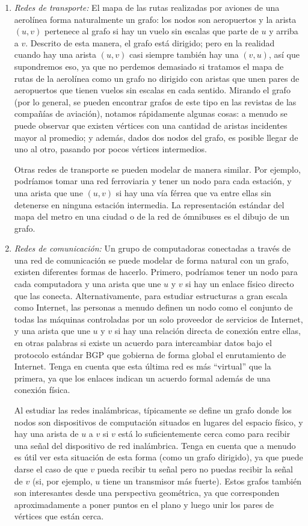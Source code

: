 \documentclass[a4paper, 12pt]{book}
\theoremstyle{dotless}
\begin{document}
\begin{enumerate}
\item \textit{Redes de transporte:} El mapa de las rutas realizadas por aviones de una aerolínea forma naturalmente un grafo: los nodos son aeropuertos y la arista $(u,v)$ pertenece al grafo si hay un vuelo sin escalas que parte de $u$ y arriba a $v$. Descrito de esta manera, el grafo está dirigido; pero en la realidad cuando hay una arista $(u,v)$ casi siempre también hay una $(v,u)$, así que supondremos eso, ya que no perdemos demasiado si tratamos el mapa de rutas de la aerolínea como un grafo no dirigido con aristas que unen pares de aeropuertos que tienen vuelos sin escalas en cada sentido. Mirando el grafo (por lo general, se pueden encontrar grafos de este tipo en las revistas de las compañías de aviación), notamos rápidamente algunas cosas: a menudo se puede observar que existen vértices con una cantidad de aristas incidentes mayor al promedio; y además, dados dos nodos del grafo, es posible llegar de uno al otro, pasando por pocos vértices intermedios. 

Otras redes de transporte se pueden modelar de manera similar. 
Por ejemplo, podríamos tomar una red ferroviaria y tener un nodo para cada estación, y una arista que une $(u,v)$ si hay una vía férrea que va entre ellas sin detenerse en ninguna estación intermedia. 
La representación estándar del mapa del metro en una ciudad o de la red de ómnibuses es el dibujo de un grafo.

\item \textit{Redes de comunicación:} 
Un grupo de computadoras conectadas a través de una red de comunicación se puede modelar de forma natural con un grafo, existen diferentes formas de hacerlo. 
Primero, podríamos tener un nodo para cada computadora y una arista que une $u$ y $v$ si hay un enlace físico directo que las conecta. 
Alternativamente, para estudiar estructuras a gran escala como Internet, las personas a menudo definen un nodo como el conjunto de todas las máquinas controladas por un solo proveedor de servicios de Internet, y una arista que une $u$ y $v$ si hay una relación directa de conexión entre ellas, en otras palabras si existe un acuerdo para intercambiar datos bajo el protocolo estándar BGP que gobierna de forma global el enrutamiento de Internet. 
Tenga en cuenta que esta última red es más ``virtual'' que la primera, ya que los enlaces indican un acuerdo formal además de una conexión física.

Al estudiar las redes inalámbricas, típicamente se define un grafo donde los nodos son dispositivos de computación situados en lugares del espacio físico, y hay una arista de $u$ a $v$ si $v$ está lo suficientemente cerca como para recibir una señal del dispositivo de red inalámbrica. 
Tenga en cuenta que a menudo es útil ver esta situación de esta forma (como un grafo dirigido), ya que puede darse el caso de que $v$ pueda recibir tu señal pero no puedas recibir la señal de $v$ (si, por ejemplo, $u$ tiene un transmisor más fuerte). 
Estos grafos también son interesantes desde una perspectiva geométrica, ya que corresponden aproximadamente a poner puntos en el plano y luego unir los pares de vértices que están cerca.


\end{enumerate}
\end{document}
